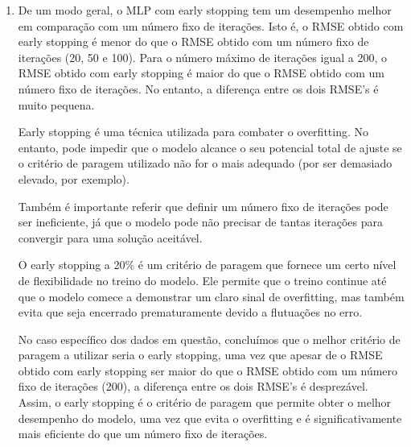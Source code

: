 \documentclass[a4paper,12pt]{article} %
\begin{document}
\begin{enumerate}
\begin{lstlisting}[language=Python]
def const(x): return average_rmse_old

# Plot the RMSE
plt.plot(iter_array, new_rmse_array, '-o', label='Different max iteration MLP')
plt.hlines(average_rmse_old, xmin=min(iter_array), xmax=max(iter_array), colors='r', linestyles='dashed', label = 'Early stopping MLP')
plt.xlabel('Number of iterations') 
plt.ylabel('RMSE')
plt.title('RMSE vs number of iterations')
plt.legend()
plt.savefig('ex3_rmse.png')
plt.show()
\end{lstlisting}

\item De um modo geral, o MLP com early stopping tem um desempenho melhor em comparação com um número fixo de iterações. Isto é, o RMSE obtido com early stopping é menor do que o RMSE obtido com um número fixo de iterações (20, 50 e 100).
Para o número máximo de iterações igual a 200, o RMSE obtido com early stopping é maior do que o RMSE obtido com um número fixo de iterações. No entanto, a diferença entre os dois RMSE's é muito pequena.

Early stopping é uma técnica utilizada para combater o overfitting. No entanto, pode impedir que o modelo alcance o seu potencial total de ajuste se o critério de paragem utilizado não for o mais adequado (por ser demasiado elevado, por exemplo).

Também é importante referir que definir um número fixo de iterações pode ser ineficiente, já que o modelo pode não precisar de tantas iterações para convergir para uma solução aceitável. 

O early stopping a 20\% é um critério de paragem que fornece um certo nível de flexibilidade no treino do modelo. Ele permite que o treino continue até que o modelo comece a demonstrar um claro sinal de overfitting, mas também evita que seja encerrado prematuramente devido a flutuações no erro.

No caso específico dos dados em questão, concluímos que o melhor critério de paragem a utilizar seria o early stopping, uma vez que apesar de o RMSE obtido com early stopping ser maior do que o RMSE obtido com um número fixo de iterações (200), a diferença entre os dois RMSE's é desprezável. 
Assim, o early stopping é o critério de paragem que permite obter o melhor desempenho do modelo, uma vez que evita o overfitting e é significativamente mais eficiente do que um número fixo de iterações.\\

\end{enumerate}
\end{document}
